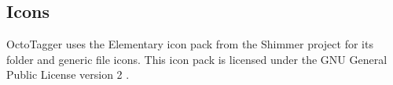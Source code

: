 \subsection{Icons}
\def\kapitelautor{Clemens Stadlbauer}

OctoTagger uses the Elementary icon pack from the Shimmer project
\cite{elementaryicons} for its folder and generic file icons. This icon pack is
licensed under the GNU General Public License version 2 \cite{GPLv2}.
